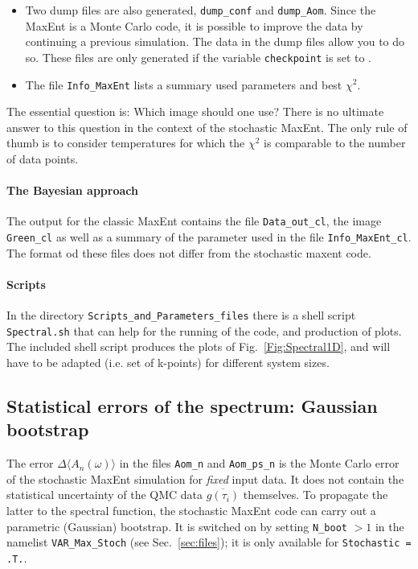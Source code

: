 \begin{itemize}
\item Two dump files are also generated, \texttt{dump\_conf} and \texttt{dump\_Aom}. Since the MaxEnt is a Monte Carlo code, it is possible to improve the data by continuing a previous simulation. The data in the dump files allow you to do so. These files are only generated if the variable \texttt{checkpoint} is set to . 

\item The  file \texttt{Info\_MaxEnt} lists a summary   used parameters  and  best $\chi^2$.  


\end{itemize}

The essential question is: Which image should one use? There is no ultimate answer to this question in the 
context of the stochastic MaxEnt. The only rule of thumb is to consider temperatures for which the \( \chi^2 \) 
is  comparable to the number of data points.

\paragraph*{The Bayesian approach}
The  output   for the classic  MaxEnt  contains  the  file  \texttt{Data\_out\_cl},  the   image \texttt{Green\_cl}  as  
well  as  a  summary  of the  parameter  used in the  file  \texttt{Info\_MaxEnt\_cl}.   The  format  od  these  files 
does  not  differ  from the   stochastic  maxent  code. 

\paragraph*{Scripts}
In the  directory  \texttt{Scripts\_and\_Parameters\_files} there  is  a  shell  script  \texttt{Spectral.sh} that can  help  
for  the  running of  the code,  and  production of  plots.   The   included  shell script produces  the  plots of  Fig.~\ref{Fig:Spectral1D}, 
and  will have to  be  adapted  (i.e.  set  of  k-points)   for  different  system  sizes.

\subsection{Statistical errors of the spectrum: Gaussian bootstrap}
\label{sec:maxent_bootstrap}
The  error  $\Delta \langle A_n(\omega) \rangle$  in the files \texttt{Aom\_n}  and \texttt{Aom\_ps\_n}  is the  Monte Carlo  error of the
stochastic  MaxEnt  simulation for  \emph{fixed}  input data.   It does not  contain  the  statistical  uncertainty of the
QMC data  $\overline{g(\tau_i)}$  themselves.   To  propagate the  latter  to  the  spectral  function, the  stochastic  MaxEnt
code  can  carry out a parametric (Gaussian) bootstrap.  It is  switched on  by  setting  \texttt{N\_boot} $>1$   in the  namelist
\texttt{VAR\_Max\_Stoch}  (see Sec.~\ref{sec:files});  it is only  available  for  \texttt{Stochastic = .T.}.

